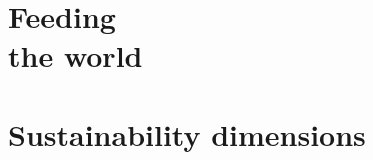 \documentclass[print,Draft]{faosyb}
\begin{document}
\begin{tablepages}
\small
  

\end{tablepages}

\part[Feeding the world]{Feeding\\ the world}
\lipsum
\EndPartIntro

\lipsum[2-12]


\part[Sustainability dimensions]{Sustain\-ability dimensions}
\lipsum
\EndPartIntro
\end{document}
